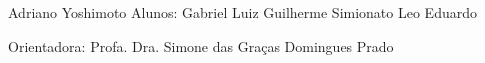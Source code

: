 \begin{folhaderosto}
	\begin{center}		
		
		\vspace*{\fill}\vspace*{\fill}
		\begin{center}
			\ABNTEXchapterfont\bfseries\Large\imprimirtitulo
		\end{center}
		\vspace*{\fill}
		
		\hspace{.45\textwidth}
		\begin{minipage}{.5\textwidth}
			\SingleSpacing
			\imprimirpreambulo
		\end{minipage}%
		
		\vspace*{1cm}
		\begin{flushright}
			\noindent Adriano Yoshimoto
			\linebreak
			\noindent Alunos:  Gabriel Luiz
			\linebreak
			\noindent Guilherme Simionato
			\linebreak
			\noindent Leo Eduardo
		\end{flushright}
		\vspace*{1cm}
		\begin{flushright}
			\noindent Orientadora: Profa. Dra. Simone das Graças Domingues Prado
		\end{flushright}
		\vspace*{1cm}
				
				
		{\large\imprimirlocal}
		\par
		{\large\imprimirdata}
		\vspace*{1cm}
		
	\end{center}
\end{folhaderosto}